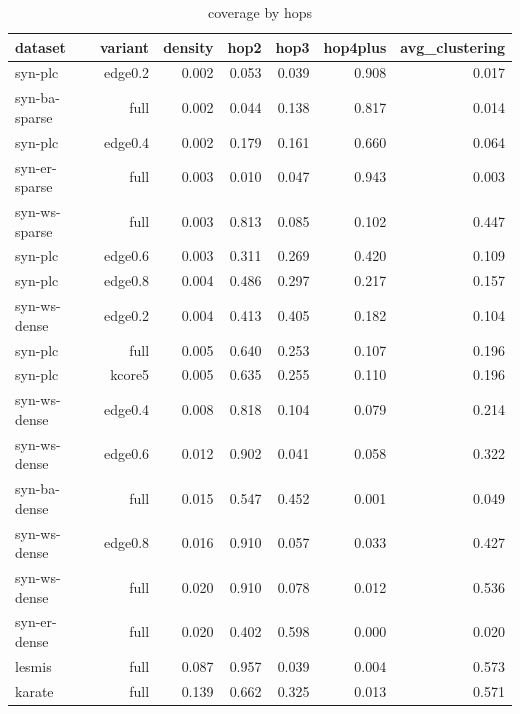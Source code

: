 \begin{table}[t]
\centering
\caption{coverage by hops}
\label{tab:coverage_by_hops}
\begin{tabular}{lrrrrrr}
\hline
dataset & variant & density & hop2 & hop3 & hop4plus & avg\_clustering \\
\hline
syn-plc & edge0.2 & 0.002 & 0.053 & 0.039 & 0.908 & 0.017 \\
syn-ba-sparse & full & 0.002 & 0.044 & 0.138 & 0.817 & 0.014 \\
syn-plc & edge0.4 & 0.002 & 0.179 & 0.161 & 0.660 & 0.064 \\
syn-er-sparse & full & 0.003 & 0.010 & 0.047 & 0.943 & 0.003 \\
syn-ws-sparse & full & 0.003 & 0.813 & 0.085 & 0.102 & 0.447 \\
syn-plc & edge0.6 & 0.003 & 0.311 & 0.269 & 0.420 & 0.109 \\
syn-plc & edge0.8 & 0.004 & 0.486 & 0.297 & 0.217 & 0.157 \\
syn-ws-dense & edge0.2 & 0.004 & 0.413 & 0.405 & 0.182 & 0.104 \\
syn-plc & full & 0.005 & 0.640 & 0.253 & 0.107 & 0.196 \\
syn-plc & kcore5 & 0.005 & 0.635 & 0.255 & 0.110 & 0.196 \\
syn-ws-dense & edge0.4 & 0.008 & 0.818 & 0.104 & 0.079 & 0.214 \\
syn-ws-dense & edge0.6 & 0.012 & 0.902 & 0.041 & 0.058 & 0.322 \\
syn-ba-dense & full & 0.015 & 0.547 & 0.452 & 0.001 & 0.049 \\
syn-ws-dense & edge0.8 & 0.016 & 0.910 & 0.057 & 0.033 & 0.427 \\
syn-ws-dense & full & 0.020 & 0.910 & 0.078 & 0.012 & 0.536 \\
syn-er-dense & full & 0.020 & 0.402 & 0.598 & 0.000 & 0.020 \\
lesmis & full & 0.087 & 0.957 & 0.039 & 0.004 & 0.573 \\
karate & full & 0.139 & 0.662 & 0.325 & 0.013 & 0.571 \\
\hline
\end{tabular}
\end{table}